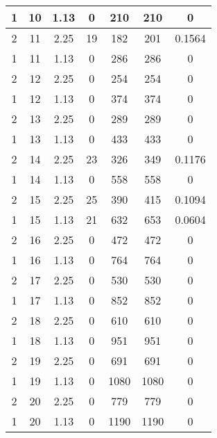 \documentclass[letterpaper, 12pt]{article}
\begin{document}
\begin{longtable}{|c|c|c|c|c|c|c|}
1 & 10 & 1.13 & 0 & 210 & 210 & 0 \\
\hline
2 & 11 & 2.25 & 19 & 182 & 201 & 0.1564 \\
\hline
1 & 11 & 1.13 & 0 & 286 & 286 & 0 \\
\hline
2 & 12 & 2.25 & 0 & 254 & 254 & 0 \\
\hline
1 & 12 & 1.13 & 0 & 374 & 374 & 0 \\
\hline
2 & 13 & 2.25 & 0 & 289 & 289 & 0 \\
\hline
1 & 13 & 1.13 & 0 & 433 & 433 & 0 \\
\hline
2 & 14 & 2.25 & 23 & 326 & 349 & 0.1176 \\
\hline
1 & 14 & 1.13 & 0 & 558 & 558 & 0 \\
\hline
2 & 15 & 2.25 & 25 & 390 & 415 & 0.1094 \\
\hline
1 & 15 & 1.13 & 21 & 632 & 653 & 0.0604 \\
\hline
2 & 16 & 2.25 & 0 & 472 & 472 & 0 \\
\hline
1 & 16 & 1.13 & 0 & 764 & 764 & 0 \\
\hline
2 & 17 & 2.25 & 0 & 530 & 530 & 0 \\
\hline
1 & 17 & 1.13 & 0 & 852 & 852 & 0 \\
\hline
2 & 18 & 2.25 & 0 & 610 & 610 & 0 \\
\hline
1 & 18 & 1.13 & 0 & 951 & 951 & 0 \\
\hline
2 & 19 & 2.25 & 0 & 691 & 691 & 0 \\
\hline
1 & 19 & 1.13 & 0 & 1080 & 1080 & 0 \\
\hline
2 & 20 & 2.25 & 0 & 779 & 779 & 0 \\
\hline
1 & 20 & 1.13 & 0 & 1190 & 1190 & 0 \\
\hline
\end{longtable}
\end{document}
